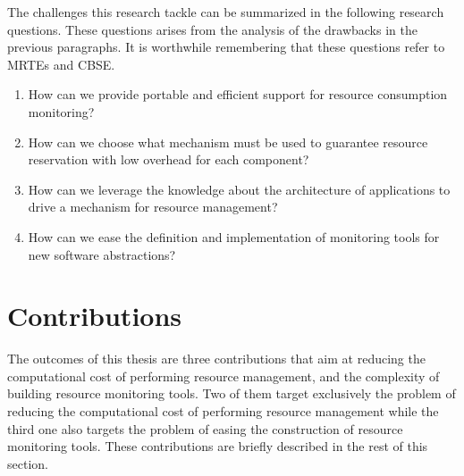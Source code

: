 The challenges this research tackle can be summarized in the following research questions.
These questions arises from the analysis of the drawbacks in the previous paragraphs.
It is worthwhile remembering that these questions refer to MRTEs and CBSE.

\begin{enumerate}
\renewcommand{\theenumi}{\textit{RQ\arabic{enumi}}}

\item How can we provide portable and efficient support for resource consumption monitoring? \label{rq:rq1}

\item How can we choose what mechanism must be used to guarantee resource reservation with low overhead for each component?
\begin{comment}
\item How can we improve resource management efficiency by relying on the fact that many applications are built on top of component models?
\end{comment}

\item How can we leverage the knowledge about the architecture of applications to drive a mechanism for resource management?

\item How can we ease the definition and implementation of monitoring tools for new software abstractions?
\end{enumerate}
 
\section{Contributions}

The outcomes of this thesis are three contributions that aim at reducing the computational cost of performing resource management, and the complexity of building resource monitoring tools.
Two of them target exclusively the problem of reducing the computational cost of performing resource management while the third one also targets the problem of easing the construction of resource monitoring tools. 
These contributions are briefly described in the rest of this section.

